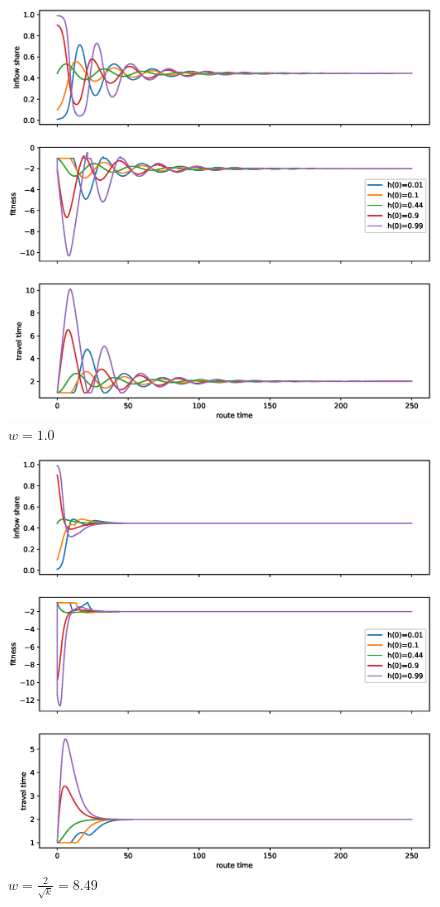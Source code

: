 \documentclass[12pt]{article}
\begin{document}
\begin{figure}
	\includegraphics[scale=0.5]{img/replicator_inits_w_1.eps}
	\caption{ $ w = 1.0 $ }
	\label{fig:replicator_inits_w_1}

\end{figure}	

\begin{figure}
	\includegraphics[scale=0.5]{img/replicator_inits_w_opt.eps}
	\caption{ $w = \frac{2}{\sqrt{k}} = 8.49$ }
	\label{fig:replicator_inits_w_opt}

\end{figure}	
\end{document}
